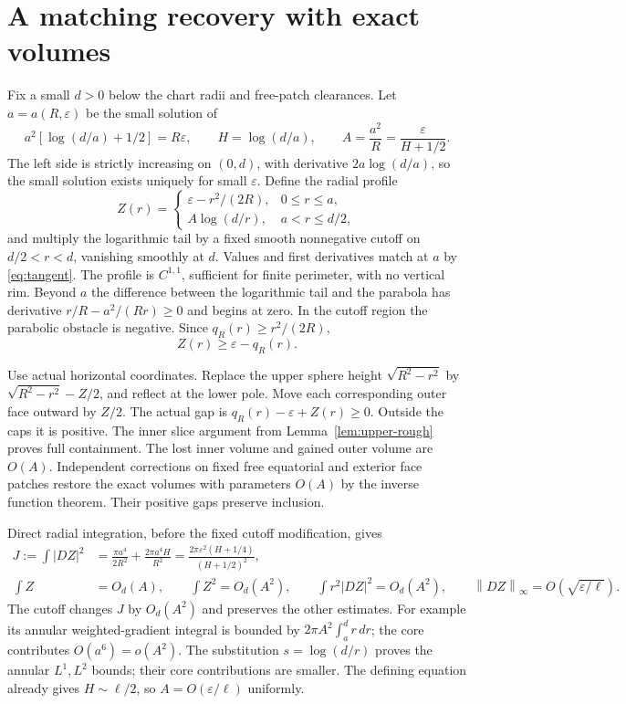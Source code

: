 \documentclass[11pt]{article}
\newcommand{\eps}{\varepsilon}
\newcommand{\norm}[1]{\left\|#1\right\|}
\theoremstyle{remark}\newtheorem{remark}[theorem]{Remark}
\numberwithin{equation}{section}
\begin{document}
\section{A matching recovery with exact volumes}\label{sec:recovery}
Fix a small $d>0$ below the chart radii and free-patch clearances. Let
$a=a(R,\eps)$ be the small solution of
\begin{equation}
 a^2[\log(d/a)+1/2]=R\eps,
 \qquad H=\log(d/a),\qquad A=\frac{a^2}{R}
                         =\frac{\eps}{H+1/2}.\label{eq:tangent}
\end{equation}
The left side is strictly increasing on $(0,d)$, with derivative
$2a\log(d/a)$, so the small solution exists uniquely for small $\eps$.
Define the radial profile
\[
 Z(r)=\begin{cases}
 \eps-r^2/(2R),&0\leq r\leq a,\\
 A\log(d/r),&a<r\leq d/2,
 \end{cases}
\]
and multiply the logarithmic tail by a fixed smooth nonnegative cutoff
on $d/2<r<d$, vanishing smoothly at $d$. Values and first derivatives
match at $a$ by \eqref{eq:tangent}. The profile is $C^{1,1}$, sufficient
for finite perimeter, with no vertical rim. Beyond $a$ the difference
between the logarithmic tail and the parabola has derivative
$r/R-a^2/(Rr)\geq0$ and begins at zero. In the cutoff region the
parabolic obstacle is negative. Since $q_R(r)\geq r^2/(2R)$,
\begin{equation}
 Z(r)\geq\eps-q_R(r).\label{eq:profile-obstacle}
\end{equation}

Use actual horizontal coordinates. Replace the upper sphere height
$\sqrt{R^2-r^2}$ by $\sqrt{R^2-r^2}-Z/2$, and reflect at the lower
pole. Move each corresponding outer face outward by $Z/2$.
The actual gap is $q_R(r)-\eps+Z(r)\geq0$. Outside the caps it is
positive. The inner slice argument from Lemma~\ref{lem:upper-rough}
proves full containment. The lost inner volume and gained outer volume
are $O(A)$. Independent corrections on fixed free equatorial and exterior
face patches restore the exact volumes with parameters $O(A)$ by the
inverse function theorem. Their positive gaps preserve inclusion.

Direct radial integration, before the fixed cutoff modification, gives
\begin{align}
 J:=\int|DZ|^2
 &=\frac{\pi a^4}{2R^2}+\frac{2\pi a^4H}{R^2}
   =\frac{2\pi\eps^2(H+1/4)}{(H+1/2)^2},\label{eq:J}\\
 \int Z&=O_d(A),\qquad \int Z^2=O_d(A^2),\qquad
 \int r^2|DZ|^2=O_d(A^2),\qquad
 \norm{DZ}_\infty=O(\sqrt{\eps/\ell}).\label{eq:weighted}
\end{align}
The cutoff changes $J$ by $O_d(A^2)$ and preserves the other estimates.
For example its annular weighted-gradient integral is bounded by
$2\pi A^2\int_a^d r\,dr$; the core contributes $O(a^6)=o(A^2)$.
The substitution $s=\log(d/r)$ proves the annular $L^1,L^2$ bounds;
their core contributions are smaller. The defining equation already
gives $H\sim\ell/2$, so $A=O(\eps/\ell)$ uniformly.
\end{document}
